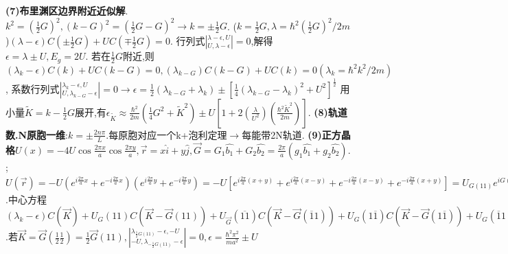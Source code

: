 \documentclass[UTF8,a4paper,10pt,twocolumn]{ctexart}
\begin{document}
  \textbf{(7)布里渊区边界附近近似解}.
  $k^2=(\frac{1}{2}G)^2,(k-G)^2=(\frac{1}{2}G-G)^2\rightarrow k=\pm\frac{1}{2}G$.
  ($k=\frac{1}{2}G,\lambda=\hbar^2(\frac{1}{2}G)^2/2m$)$(\lambda-\epsilon)C(\pm\frac{1}{2}G)+UC(\mp\frac{1}{2}G)=0$.
  行列式$|^{\lambda-\epsilon,U}_{U,\lambda-\epsilon}|=0$,解得$\epsilon=\lambda\pm U,E_g=2U$.
  若在$\frac{1}{2}G$附近,则$(\lambda_k-\epsilon)C(k)+UC(k-G)=0,(\lambda_{k-G})C(k-G)+UC(k)=0(\lambda_k=\hbar^2k^2/2m)$,
  系数行列式$|^{\lambda_k-\epsilon,U}_{U,\lambda_{k-G}-\epsilon}|=0\rightarrow\epsilon=\frac{1}{2}(\lambda_{k-G}+\lambda_k)\pm[\frac{1}{4}(\lambda_{k-G}-\lambda_k)^2+U^2]^\frac{1}{2}$
  用小量$\widetilde{K}=k-\frac{1}{2}G$展开,有$\epsilon_{\widetilde{K}}\approx\frac{\hbar^2}{2m}(\frac{1}{4}G^2+\widetilde{K}^2)\pm U[1+2(\frac{\lambda}{U^2})(\frac{\hbar^2\widetilde{K}^2}{2m})]$.
  \textbf{(8)轨道数.N原胞一维}:$k=\pm\frac{2n\pi}{L}$.每原胞对应一个k+泡利定理$\rightarrow$每能带2N轨道.
  \textbf{(9)正方晶格}$U(x)=-4U\cos{\frac{2\pi x}{a}}\cos{\frac{2\pi y}{a}},\vec{r}=x\hat{i}+y\hat{j},\vec{G}=G_1\hat{b_1}+G_2\hat{b_2}=\frac{2\pi}{a}(g_1\hat{b_1}+g_2\hat{b_2}).$;$U(\vec{r})=-U(e^{i\frac{2\pi}{a}x}+e^{-i\frac{2\pi}{a}x})(e^{i\frac{2\pi}{a}y}+e^{-i\frac{2\pi}{a}y})=-U[e^{i\frac{2\pi}{a}(x+y)}+e^{i\frac{2\pi}{a}(x-y)}+e^{-i\frac{2\pi}{a}(x-y)}+e^{-i\frac{2\pi}{a}(x+y)}]=U_{G(11)}e^{iG(11)\cdot \vec{r}}+U_{G(\overline{1}1)}e^{iG(\overline{1}1)\cdot \vec{r}}+U_{G(1\overline{1})}e^{iG(1\overline{1})\cdot \vec{r}}+U_{G(\overline{11})}e^{iG(\overline{11})\cdot\vec{r}}=\sum_{G(11)}e^{iG(11)\cdot\vec{r}}$.中心方程$(\lambda_k-\epsilon)C(\vec{K})+U_G(11)C(\vec{K}-\vec{G}(11))+U_{\vec{G}}(\overline{11})C(\vec{K}-\vec{G}(\overline{1}1))+U_G(1\overline{1})C(\vec{K}-\vec{G}(1\overline{1}))+U_G(\overline{1}1)C(\vec{K}-\vec{G}(\overline{1}1))$.若$\vec{K}=\vec{G}(\frac{1}{2}\frac{1}{2})=\frac{1}{2}\vec{G}(11),|^{\lambda_{\frac{1}{2}G(11)}-\epsilon,-U}_{-U,\lambda_{-\frac{1}{2}G(11)}-\epsilon}|=0,
  \epsilon=\frac{\hbar^2\pi^2}{ma^2}\pm U$
   
\end{document}

